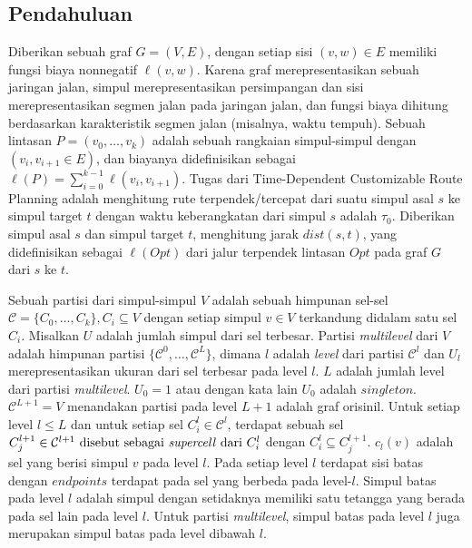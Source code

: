 \subsection{Pendahuluan}
\label{subsec:tdcrp-preliminaries}
Diberikan sebuah graf $G=(V,E)$, dengan setiap sisi $(v,w)\in E$ memiliki fungsi biaya nonnegatif $\ell(v,w)$. Karena graf merepresentasikan sebuah jaringan jalan, simpul merepresentasikan persimpangan dan sisi merepresentasikan segmen jalan pada jaringan jalan, dan fungsi biaya dihitung berdasarkan karakteristik segmen jalan (misalnya, waktu tempuh). Sebuah lintasan $P=(v_0,\ldots,v_k)$ adalah sebuah rangkaian simpul-simpul dengan $(v_i, v_{i+1}\in E)$, dan biayanya didefinisikan sebagai $\ell(P)=\sum_{i=0}^{k-1}\ell(v_i,v_{i+1})$. Tugas dari Time-Dependent Customizable Route Planning adalah menghitung rute terpendek/tercepat dari suatu simpul asal $s$ ke simpul target $t$ dengan waktu keberangkatan dari simpul $s$ adalah $\tau_0$. Diberikan simpul asal $s$ dan simpul target $t$, \cite{Delling2015} menghitung jarak $dist(s,t)$, yang didefinisikan sebagai $\ell(Opt)$ dari jalur terpendek lintasan $Opt$ pada graf $G$ dari $s$ ke $t$.

Sebuah partisi dari simpul-simpul $V$ adalah sebuah himpunan sel-sel $\mathcal{C}=\{C_0,\ldots, C_k\}, C_i\subseteq V$ dengan setiap simpul $v\in V$ terkandung didalam satu sel $C_i$. Misalkan $U$ adalah jumlah simpul dari sel terbesar. Partisi \textit{multilevel} dari $V$ adalah himpunan partisi $\{\mathcal{C}^{0},\ldots, \mathcal{C}^{L}\}$, dimana $l$ adalah \textit{level} dari partisi $\mathcal{C}^{l}$ dan $U_{l}$ merepresentasikan ukuran dari sel terbesar pada level $l$. $L$ adalah jumlah level dari partisi \textit{multilevel}. $U_{0}=1$ atau dengan kata lain $U_{0}$ adalah $singleton$. $\mathcal{C}^{L+1}=V$ menandakan partisi pada level $L+1$ adalah graf orisinil. Untuk setiap level $l\leq L$ dan untuk setiap sel $C_{i}^{l}\in\mathcal{C}^l$, terdapat sebuah sel $C_{j}^{l+1}\in\mathcal{C}^{l+1} \text{ disebut sebagai \textit{supercell} dari } C_i^l$ dengan $C_i^l\subseteq C_j^{l+1}$. $c_l(v)$ adalah sel yang berisi simpul $v$ pada level $l$. Pada setiap level $l$ terdapat sisi batas dengan $endpoints$ terdapat pada sel yang berbeda pada level-$l$. Simpul batas pada level $l$ adalah simpul dengan setidaknya memiliki satu tetangga yang berada pada sel lain pada level $l$. Untuk partisi \textit{multilevel}, simpul batas pada level $l$ juga merupakan simpul batas pada level dibawah $l$.

